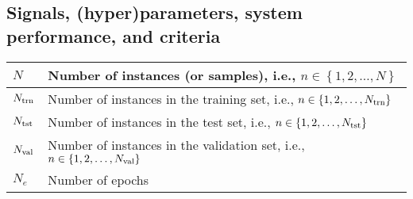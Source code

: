 \subsection{Signals, (hyper)parameters, system performance, and criteria}
\begin{xltabular}{\textwidth}{XX}
	\(N\)                                                                                                                                                                          & Number of instances (or samples), i.e., \(n \in \left\{ 1, 2, \dots, N \right\}\)                                                                                                                                                                                                                                                      \\ \hline
	\(N_{\textnormal{trn}}\)                                                                                                                                                       & Number of instances in the training set, i.e., \(n \in \left\{ 1, 2, \dots, N_\textnormal{trn} \right\}\)                                                                                                                                                                                                                              \\ \hline
	\(N_{\textnormal{tst}}\)                                                                                                                                                       & Number of instances in the test set, i.e., \(n \in \left\{ 1, 2, \dots, N_\textnormal{tst} \right\}\)                                                                                                                                                                                                                                  \\ \hline
	\(N_{\textnormal{val}}\)                                                                                                                                                       & Number of instances in the validation set, i.e., \(n \in \left\{ 1, 2, \dots, N_\textnormal{val} \right\}\)                                                                                                                                                                                                                            \\ \hline
	\(N_e\)                                                                                                                                                                        & Number of epochs                                                                                                                                                                                                                                                                                                                       \\ \hline

\end{xltabular}
